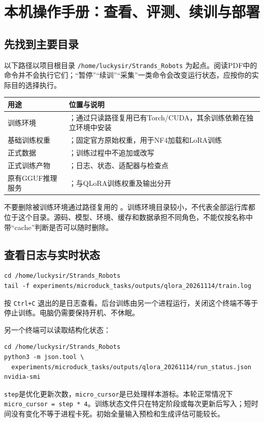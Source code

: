 \chapter{本机操作手册：查看、评测、续训与部署}
\section{先找到主要目录}
以下路径以项目根目录 \texttt{/home/luckysir/Strands\_Robots} 为起点。阅读PDF中的命令并不会执行它们；“暂停”“续训”“采集”一类命令会改变运行状态，应按你的实际目的选择执行。

\begin{longtable}{P{46mm}P{105mm}}
\toprule
用途 & 位置与说明\\
\midrule
\endhead
训练环境 & ；通过只读路径复用已有Torch/CUDA，其余训练依赖在独立环境中安装\\
基础训练权重 & ；固定官方原始权重，用于NF4加载和LoRA训练\\
正式数据 & ；训练过程中不追加或改写\\
正式训练产物 & ；日志、状态、适配器与检查点\\
原有GGUF推理服务 & ；与QLoRA训练权重及输出分开\\
\bottomrule
\end{longtable}

不要删除被训练环境通过路径复用的 。训练环境目录较小，不代表全部运行库都位于这个目录。源码、模型、环境、缓存和数据承担不同角色，不能仅按名称中带“cache”判断是否可以随时删除。

\section{查看日志与实时状态}
\begin{Verbatim}
cd /home/luckysir/Strands_Robots
tail -f experiments/microduck_tasks/outputs/qlora_20261114/train.log
\end{Verbatim}
按 \texttt{Ctrl+C} 退出的是日志查看。后台训练由另一个进程运行，关闭这个终端不等于停止训练。电脑仍需要保持开机、不休眠。

另一个终端可以读取结构化状态：
\begin{Verbatim}
cd /home/luckysir/Strands_Robots
python3 -m json.tool \
  experiments/microduck_tasks/outputs/qlora_20261114/run_status.json
nvidia-smi
\end{Verbatim}
\texttt{step}是优化更新次数，\texttt{micro\_cursor}是已处理样本游标。本轮正常情况下 \texttt{micro\_cursor = step * 4}。训练状态文件只在特定阶段或每次更新后写入；短时间没有变化不等于进程卡死。初始全量输入预检和生成评估可能较长。

